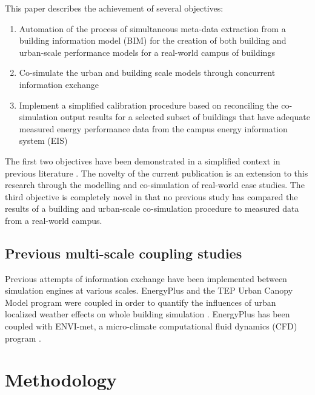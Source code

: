 \documentclass{tBPS2e}
\theoremstyle{plain}
\theoremstyle{definition}
\theoremstyle{remark}
\begin{document}
This paper describes the achievement of several objectives:
\begin{enumerate}
  \item Automation of the process of simultaneous meta-data extraction from a building information model (BIM) for the creation of both building and urban-scale performance models for a real-world campus of buildings
  \item Co-simulate the urban and building scale models through concurrent information exchange
  \item Implement a simplified calibration procedure based on reconciling the co-simulation output results for a selected subset of buildings that have adequate measured energy performance data from the campus energy information system (EIS) 
\end{enumerate}

The first two objectives have been demonstrated in a simplified context in previous literature \citep{thomas2014multiscale,Miller:2015vk}. The novelty of the current publication is an extension to this research through the modelling and co-simulation of real-world case studies. The third objective is completely novel in that no previous study has compared the results of a building and urban-scale co-simulation procedure to measured data from a real-world campus. 

\subsection{Previous multi-scale coupling studies}
Previous attempts of information exchange have been implemented between simulation engines at various scales. EnergyPlus and the TEP Urban Canopy Model program were coupled in order to quantify the influences of urban localized weather effects on whole building simulation \citep{Bueno:2011hi}. EnergyPlus has been coupled with ENVI-met, a micro-climate computational fluid dynamics (CFD) program
\citep{Yang:2012cr}.

\section{Methodology}\label{Methodology}
\end{document}
